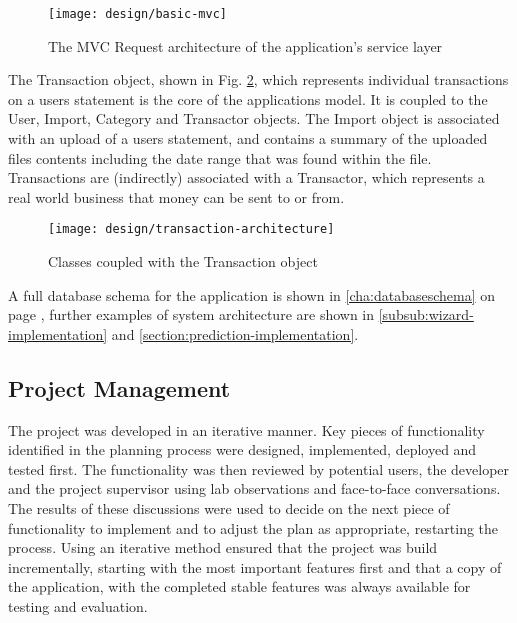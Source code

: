 \begin{figure}[h]
    \centering
    \texttt{[image: design/basic-mvc]}
    \caption[The MVC Request architecture of the applications service layer]{The MVC Request architecture of the application's service layer \parencite{cakephp2014mvc}}
    \label{fig:basic-mvc}
\end{figure}

The Transaction object, shown in Fig. \ref{fig:transactorcoupling}, which represents individual transactions on a users statement is the core of the applications model. It is coupled to the User, Import, Category and Transactor objects. The Import object is associated with an upload of a users statement, and contains a summary of the uploaded files contents including the date range that was found within the file. Transactions are (indirectly) associated with a Transactor, which represents a real world business that money can be sent to or from.

\begin{figure}[h]
    \centering
    \texttt{[image: design/transaction-architecture]}
    \caption{Classes coupled with the Transaction object}
    \label{fig:transactorcoupling}
    
    \begin{comment}
[Transaction]<>*-0..1[Transactor]
[Transaction]++*-1[User]
[Transaction]<>*-1[Import]
[Transactor]<>*-1[Category]
[Import]<>*-1[User]
    \end{comment}
\end{figure}

A full database schema for the application is shown in \autoref{cha:databaseschema} on page \pageref{cha:databaseschema}, further examples of system architecture are shown in \autoref{subsub:wizard-implementation} and \autoref{section:prediction-implementation}.

\subsection{Project Management}
The project was developed in an iterative manner. Key pieces of functionality identified in the planning process were designed, implemented, deployed and tested first. The functionality was then reviewed by potential users, the developer and the project supervisor using lab observations and face-to-face conversations. The results of these discussions were used to decide on the next piece of functionality to implement and to adjust the plan as appropriate, restarting the process. Using an iterative method ensured that the project was build incrementally, starting with the most important features first and that a copy of the application, with the completed stable features was always available for testing and evaluation.

